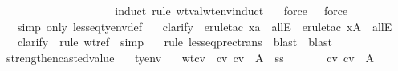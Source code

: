 \begin{isabellebody}
\ \ \ {\isasymand}\ {\isacharparenleft}{\isasymGamma}{\isacharsemicolon}{\isasymSigma}\ {\isasymturnstile}\ {\isasymrho}\ {\isasymlongrightarrow}\ {\isacharparenleft}{\isasymforall}\ {\isasymSigma}{\isacharprime}{\isachardot}\ {\isasymSigma}{\isacharprime}\ {\isasymsqsubseteq}\ {\isasymSigma}\ {\isasymlongrightarrow}\ {\isasymGamma}{\isacharsemicolon}{\isasymSigma}{\isacharprime}\ {\isasymturnstile}\ {\isasymrho}{\isacharparenright}{\isacharparenright}{\isachardoublequoteclose}\isanewline
\isadelimproof
\ \ \endisadelimproof
\isatagproof
{}\isamarkupfalse \ {\isacharparenleft}induct\ rule{\isacharcolon}\ wt{\isacharunderscore}val{\isacharunderscore}wt{\isacharunderscore}env{\isachardot}induct{\isacharparenright}\isanewline
\ \ \isamarkupfalse \ force{\isacharplus}\ \isamarkupfalse \ \isamarkupfalse \ force{\isacharplus}\isanewline
\ \ \isamarkupfalse \ {\isacharparenleft}simp\ only{\isacharcolon}\ lesseq{\isacharunderscore}tyenv{\isacharunderscore}def{\isacharparenright}\isanewline
\ \ \isamarkupfalse \ clarify\ \isamarkupfalse \ {\isacharparenleft}erule{\isacharunderscore}tac\ x{\isacharequal}a\ \ allE{\isacharparenright}\ \isamarkupfalse \ {\isacharparenleft}erule{\isacharunderscore}tac\ x{\isacharequal}A\ \ allE{\isacharparenright}\isanewline
\ \ \isamarkupfalse \ clarify\ \isamarkupfalse \ {\isacharparenleft}rule\ wt{\isacharunderscore}ref{\isacharparenright}\ \isamarkupfalse \ simp\isanewline
\ \ \isamarkupfalse \ {\isacharparenleft}rule\ lesseq{\isacharunderscore}prec{\isacharunderscore}trans{\isacharparenright}\ \isamarkupfalse \ blast\ \isamarkupfalse \ blast\isanewline
\ \ \isamarkupfalse \endisatagproof
{\isafoldproof}\isadelimproof
\isanewline
\endisadelimproof
\isanewline
{}\isamarkupfalse \ strengthen{\isacharunderscore}casted{\isacharunderscore}value{\isacharcolon}\isanewline
\ \ \ {\isasymSigma}{\isacharcolon}{\isacharcolon}ty{\isacharunderscore}env\isanewline
\ \ \ wtcv{\isacharcolon}\ {\isachardoublequoteopen}{\isasymSigma}\ {\isasymturnstile}cv\ cv\ {\isacharcolon}\ A{\isachardoublequoteclose}\ \ ss{\isacharcolon}\ {\isachardoublequoteopen}{\isasymSigma}{\isacharprime}\ {\isasymsqsubseteq}\ {\isasymSigma}{\isachardoublequoteclose}\isanewline
\ \ \ {\isachardoublequoteopen}{\isasymSigma}{\isacharprime}\ {\isasymturnstile}cv\ cv\ {\isacharcolon}\ A{\isachardoublequoteclose}\isanewline

\end{isabellebody}
